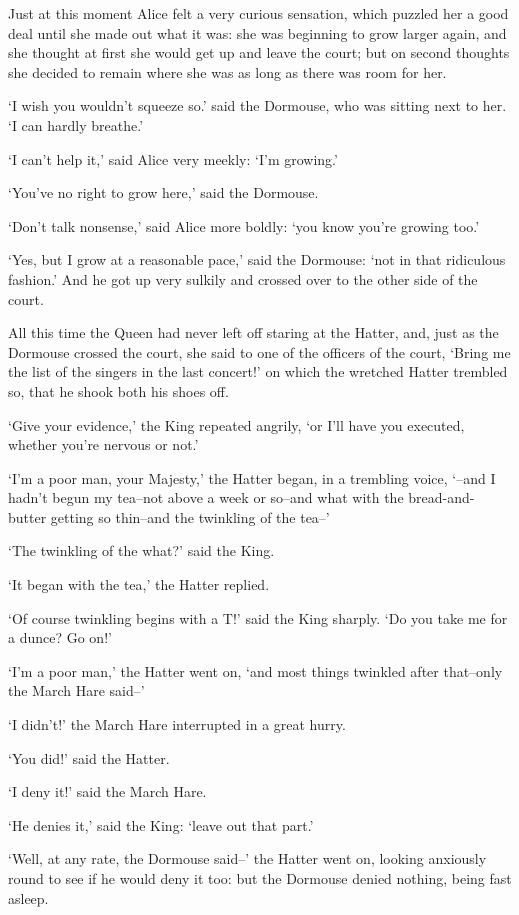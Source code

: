 \documentclass[statementpaper,twoside,openany]{memoir}
\begin{document}
Just at this moment Alice felt a very curious sensation, which puzzled her a good deal until she made out what it was: she was beginning to grow larger again, and she thought at first she would get up and leave the court; but on second thoughts she decided to remain where she was as long as there was room for her.

`I wish you wouldn't squeeze so.' said the Dormouse, who was sitting next to her. `I can hardly breathe.'

`I can't help it,' said Alice very meekly: `I'm growing.'

`You've no right to grow here,' said the Dormouse.

`Don't talk nonsense,' said Alice more boldly: `you know you're growing too.'

`Yes, but I grow at a reasonable pace,' said the Dormouse: `not in that ridiculous fashion.' And he got up very sulkily and crossed over to the other side of the court.

All this time the Queen had never left off staring at the Hatter, and, just as the Dormouse crossed the court, she said to one of the officers of the court, `Bring me the list of the singers in the last concert!' on which the wretched Hatter trembled so, that he shook both his shoes off.

`Give your evidence,' the King repeated angrily, `or I'll have you executed, whether you're nervous or not.'

`I'm a poor man, your Majesty,' the Hatter began, in a trembling voice, `--and I hadn't begun my tea--not above a week or so--and what with the bread-and-butter getting so thin--and the twinkling of the tea--'

`The twinkling of the what?' said the King.

`It began with the tea,' the Hatter replied.

`Of course twinkling begins with a T!' said the King sharply. `Do you take me for a dunce? Go on!'

`I'm a poor man,' the Hatter went on, `and most things twinkled after that--only the March Hare said--'

`I didn't!' the March Hare interrupted in a great hurry.

`You did!' said the Hatter.

`I deny it!' said the March Hare.

`He denies it,' said the King: `leave out that part.'

`Well, at any rate, the Dormouse said--' the Hatter went on, looking anxiously round to see if he would deny it too: but the Dormouse denied nothing, being fast asleep.
\end{document}
